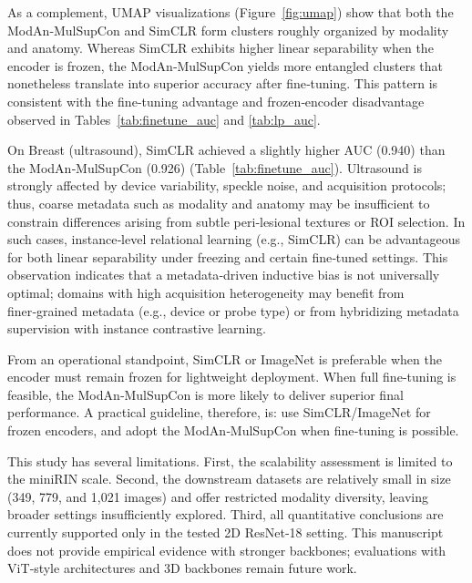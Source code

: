 \documentclass[final,1p,times]{elsarticle}
\newcommand{\revadd}[1]{#1}
\DeclareRobustCommand{\revdel}[1]{}
\begin{document}
As a complement, UMAP visualizations (Figure~\ref{fig:umap}) show that both the ModAn‑MulSupCon and SimCLR form clusters roughly organized by modality and anatomy.
Whereas SimCLR exhibits higher linear separability when the encoder is frozen, the ModAn‑MulSupCon yields more entangled clusters that nonetheless translate into superior accuracy after fine‑tuning. This pattern is consistent with the fine‑tuning advantage and frozen‑encoder disadvantage observed in Tables~\ref{tab:finetune_auc} and \ref{tab:lp_auc}.

On Breast (ultrasound), SimCLR achieved a slightly higher AUC (0.940) than the ModAn‑MulSupCon (0.926) (Table~\ref{tab:finetune_auc}). Ultrasound is strongly affected by device variability, speckle noise, and acquisition protocols; thus, coarse metadata such as modality and anatomy may be insufficient to constrain differences arising from subtle peri‑lesional textures or ROI selection. In such cases, instance‑level relational learning (e.g., SimCLR) can be advantageous for both linear separability under freezing and certain fine‑tuned settings. This observation indicates that a metadata‑driven inductive bias is not universally optimal; domains with high acquisition heterogeneity may benefit from finer‑grained metadata (e.g., device or probe type) or from hybridizing metadata supervision with instance contrastive learning.

From an operational standpoint, SimCLR or ImageNet is preferable when the encoder must remain frozen for lightweight deployment. When full fine‑tuning is feasible, the ModAn‑MulSupCon is more likely to deliver superior final performance. A practical guideline, therefore, is: use SimCLR/ImageNet for frozen encoders, and adopt the ModAn‑MulSupCon when fine‑tuning is possible.

This study has several limitations. First, the scalability assessment is limited to the miniRIN scale. Second, \revdel{the downstream datasets offer restricted modality diversity, leaving untested regions}\revadd{the downstream datasets are relatively small in size (349, 779, and 1,021 images) and offer restricted modality diversity, leaving broader settings insufficiently explored}. Third, \revdel{our evaluation assumes a ResNet-18 backbone; extensions to ViT-style architectures and 3D backbones are needed}\revadd{all quantitative conclusions are currently supported only in the tested 2D ResNet‑18 setting. This manuscript does not provide empirical evidence with stronger backbones; evaluations with ViT‑style architectures and 3D backbones remain future work}.
\end{document}
